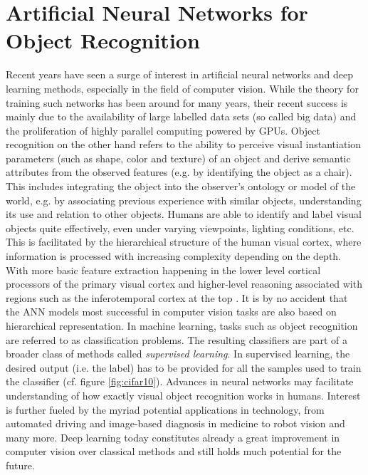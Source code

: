 \section{Artificial Neural Networks for Object Recognition}
Recent years have seen a surge of interest in artificial neural networks and deep learning methods, especially in the field of computer vision. While the theory for training such networks has been around for many years, their recent success is mainly due to the availability of large labelled data sets (so called big data) and the proliferation of highly parallel computing powered by GPUs. Object recognition on the other hand refers to the ability to perceive visual instantiation parameters (such as shape, color and texture) of an object and derive semantic attributes from the observed features (e.g. by identifying the object as a chair). This includes integrating the object into the observer's ontology or model of the world, e.g. by associating previous experience with similar objects, understanding its use and relation to other objects. Humans are able to identify and label visual objects quite effectively, even under varying viewpoints, lighting conditions, etc.
This is facilitated by the hierarchical structure of the human visual cortex, where information is processed with increasing complexity depending on the depth. With more basic feature extraction happening in the lower level cortical processors of the primary visual cortex and higher-level reasoning associated with regions such as the inferotemporal cortex at the top \cite{marr1976early,bar2003cortical}.
It is by no accident that the ANN models most successful in computer vision tasks are also based on hierarchical representation. In machine learning, tasks such as object recognition are referred to as classification problems. The resulting classifiers are part of a broader class of methods called \emph{supervised learning}. In supervised learning, the desired output (i.e. the label) has to be provided for all the samples used to train the classifier (cf. figure \ref{fig:cifar10}).
Advances in neural networks may facilitate understanding of how exactly visual object recognition works in humans. Interest is further fueled by the myriad potential applications in technology, from automated driving and image-based diagnosis in medicine to robot vision and many more. Deep learning today constitutes already a great improvement in computer vision over classical methods and still holds much potential for the future.
